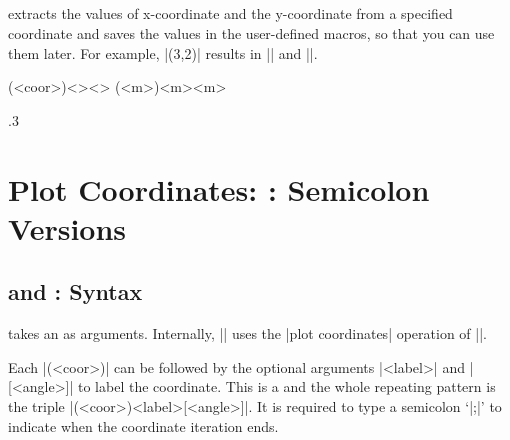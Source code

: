 \section{\protect\cmd{\tzgetxyval}}
\label{s:tzgetxyval}

\icmd{\tzgetxyval} extracts the values of x-coordinate and the y-coordinate  from a specified coordinate and saves the values in the user-defined macros, so that you can use them later.
For example, |\tzgetxyval(3,2){\xval}{\yval}| results in || and ||.

\begin{tzdef}{}
\tzgetxyval(<coor>){<\macroXval>}{<\macroYval>}
(<m>){<m>}{<m>}
\end{tzdef}

\begin{tzcode}{.3}
\end{tzcode}


\chapter{Plot Coordinates: \protect\cmd{\tzplot}: Semicolon Versions}
\label{c:plotcoordinates}

\section{\protect\cmd{\tzplot} and \protect\cmd{\tzplot*}: Syntax}
\label{s:tzplot}

\icmd{\tzplot} takes an  as arguments. Internally, |\tzplot| uses the |plot coordinates| operation of |\Tikz|.

Each |(<coor>)| can be followed by the optional arguments |{<label>}| and |[<angle>]| to label the coordinate. This is a  and the whole repeating pattern is the triple |(<coor>){<label>}[<angle>]|. It is required to type a semicolon `|;|' to indicate when the coordinate iteration ends.


